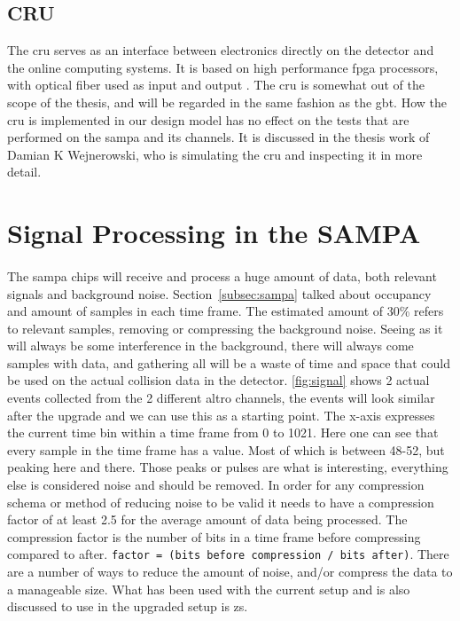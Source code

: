 \documentclass[a4paper, 12pt]{report}
\newcommand{\codeword}[1]{\texttt{#1}}
\begin{document}
\subsection{CRU}
The \gls{cru} serves as an interface between electronics directly on the detector and the online computing systems.
It is based on high performance \gls{fpga} processors, with optical fiber used as input and output \cite{tdr-015}. 
The \gls{cru} is somewhat out of the scope of the thesis, and will be regarded in the same fashion as the \gls{gbt}.
How the \gls{cru} is implemented in our design model has no effect on the tests that are performed on the \gls{sampa} and its channels.
It is discussed in the thesis work of Damian K Wejnerowski, who is simulating the \gls{cru} and inspecting it in more detail.

\section{Signal Processing in the SAMPA}
\paragraph{}
The \gls{sampa} chips will receive and process a huge amount of data, both relevant signals and background noise.
Section~\ref{subsec:sampa} talked about occupancy and amount of samples in each time frame.
The estimated amount of 30\% refers to relevant samples, removing or compressing the background noise.
Seeing as it will always be some interference in the background, there will always come samples with data, and gathering all will be a waste of time and space that could be used on the actual collision data in the detector.
\ref{fig:signal} shows 2 actual events collected from the 2 different \gls{altro} channels, the events will look similar after the upgrade and we can use this as a starting point.
The x-axis expresses the current time bin within a time frame from 0 to 1021.
Here one can see that every sample in the time frame has a value.
Most of which is between 48-52, but peaking here and there.
Those peaks or pulses are what is interesting, everything else is considered noise and should be removed.
In order for any compression schema or method of reducing noise to be valid it needs to have a compression factor of at least 2.5 for the average amount of data being processed.
The compression factor is the number of bits in a time frame before compressing compared to after. \codeword{factor = (bits before compression / bits after)}.
There are a number of ways to reduce the amount of noise, and/or compress the data to a manageable size.
What has been used with the current setup and is also discussed to use in the upgraded setup is \gls{zs}.
\end{document}
